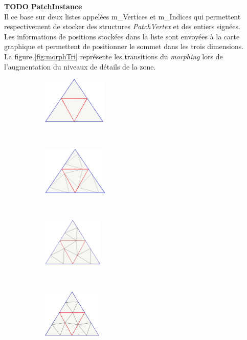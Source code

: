   \textbf{TODO PatchInstance}\\
  
  Il ce base sur deux listes appelées m\_Vertices et m\_Indices qui permettent respectivement de stocker des structures \textit{PatchVertex} et des entiers signées.\\
  
  Les informations de positions stockées dans la liste sont envoyées à la carte graphique et permettent de positionner le sommet dans les trois dimensions.\\
  
  La figure \ref{fig:morphTri} représente les transitions du \textit{morphing} lors de l'augmentation du niveaux de détails de la zone.
  	
\begin{figure}[H]
    \centering
    \begin{subfigure}[b]{0.17\textwidth}
       \centering \includegraphics[width=\textwidth,height=2.25cm]{img/morph5.png}
       \caption{}\label{subfig:morph5}
    \end{subfigure}
    ~ 
    \begin{subfigure}[b]{0.17\textwidth}
       \centering \includegraphics[width=\textwidth,height=2.3cm]{img/morph4.png}
       \caption{}\label{subfig:morph4}
    \end{subfigure}
    ~
    \begin{subfigure}[b]{0.17\textwidth}
       \centering \includegraphics[width=\textwidth,height=2.3cm]{img/morph3.png}
       \caption{}\label{subfig:morph3}
    \end{subfigure}
    ~
    \begin{subfigure}[b]{0.16\textwidth}
       \centering \includegraphics[width=\textwidth,height=2.3cm]{img/morph2.png}

\end{subfigure}
\end{figure}
